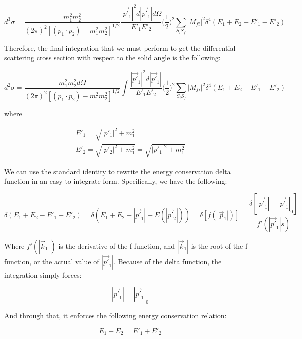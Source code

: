 \documentclass[a4]{article}
\begin{document}
    \begin{equation}
        d^3 \sigma = \frac{m_1^2 m_2^2}{(2 \pi)^2 [(p_1 \cdot p_2) - m_1^2 m_2^2]^{1/2}} \frac{|\vec{p'}_1|^2 d |\vec{p'}_1| d \Omega}{E'_1 E'_2} \bigg( \frac{1}{2} \bigg)^2 \sum_{S_i S_f} |M_{fi}|^2 \delta^4 (E_{1} + E_{2} - E'_{1} - E'_{2})
    \end{equation}

    Therefore, the final integration that we must perform to get the differential scattering cross section with respect to the solid angle is the following:

    \begin{equation}
        d^2 \sigma = \frac{m_1^2 m_2^2 d \Omega}{(2 \pi)^2 [(p_1 \cdot p_2) - m_1^2 m_2^2]^{1/2}} \int \frac{|\vec{p'}_1|^2 d |\vec{p'}_1|}{E'_1 E'_2} \bigg( \frac{1}{2} \bigg)^2 \sum_{S_i S_f} |M_{fi}|^2 \delta^4 (E_{1} + E_{2} - E'_{1} - E'_{2})
    \end{equation}

    where

    \begin{eqnarray}
        E'_1 = \sqrt{|p'_1|^2 + m_1^2} \\
        E'_2 = \sqrt{|p'_2|^2 + m_1^2} = \sqrt{|p'_1|^2 + m_1^2}
    \end{eqnarray}

    We can use the standard identity to rewrite the energy conservation delta function in an easy to integrate form. Specifically, we have the following: 

    \begin{equation}
        \delta (E_1 + E_2 - E'_1 - E'_2) = \delta (E_1 + E_2 - |\vec{p'}_1| - E (|\vec{p'}_2|) ) = \delta [f (|\vec{p}_1|)] = \frac{\delta [|\vec{p'}_1| - |\vec{p'}_1|_0]}{f' (|\vec{p'}_1|s)}
    \end{equation}

    Where $f'(|\vec{k}_1|)$ is the derivative of the f-function, and $|\vec{k}_1|$ is the root of the f-function, or the actual value of $|\vec{p'}_1|$. Because of the delta function, the integration simply forces:

    \begin{equation}
        |\vec{p'}_1| = |\vec{p'}_1|_0
    \end{equation}

    And through that, it enforces the following energy conservation relation:

    \begin{equation}
        E_1 + E_2 = E'_1 + E'_2
    \end{equation}
\end{document}
